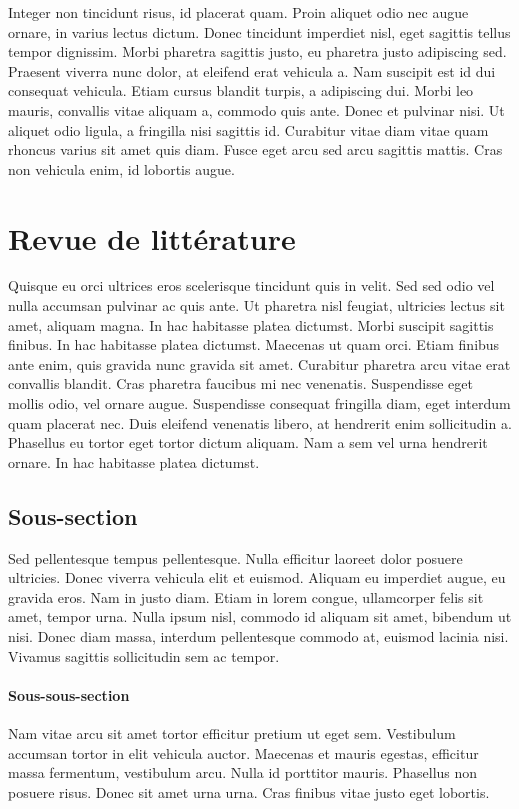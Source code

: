 Integer non tincidunt risus, id placerat quam. Proin aliquet odio nec augue ornare, in varius lectus dictum. Donec tincidunt imperdiet nisl, eget sagittis tellus tempor dignissim. Morbi pharetra sagittis justo, eu pharetra justo adipiscing sed. Praesent viverra nunc dolor, at eleifend erat vehicula a. Nam suscipit est id dui consequat vehicula. Etiam cursus blandit turpis, a adipiscing dui. Morbi leo mauris, convallis vitae aliquam a, commodo quis ante. Donec et pulvinar nisi. Ut aliquet odio ligula, a fringilla nisi sagittis id. Curabitur vitae diam vitae quam rhoncus varius sit amet quis diam. Fusce eget arcu sed arcu sagittis mattis. Cras non vehicula enim, id lobortis augue.

\section{Revue de littérature}
Quisque eu orci ultrices eros scelerisque tincidunt quis in velit. Sed sed odio vel nulla accumsan pulvinar ac quis ante. Ut pharetra nisl feugiat, ultricies lectus sit amet, aliquam magna. In hac habitasse platea dictumst. Morbi suscipit sagittis finibus. In hac habitasse platea dictumst. Maecenas ut quam orci. Etiam finibus ante enim, quis gravida nunc gravida sit amet. Curabitur pharetra arcu vitae erat convallis blandit. Cras pharetra faucibus mi nec venenatis. Suspendisse eget mollis odio, vel ornare augue. Suspendisse consequat fringilla diam, eget interdum quam placerat nec. Duis eleifend venenatis libero, at hendrerit enim sollicitudin a. Phasellus eu tortor eget tortor dictum aliquam. Nam a sem vel urna hendrerit ornare. In hac habitasse platea dictumst.

\subsection{Sous-section}
Sed pellentesque tempus pellentesque. Nulla efficitur laoreet dolor posuere ultricies. Donec viverra vehicula elit et euismod. Aliquam eu imperdiet augue, eu gravida eros. Nam in justo diam. Etiam in lorem congue, ullamcorper felis sit amet, tempor urna. Nulla ipsum nisl, commodo id aliquam sit amet, bibendum ut nisi. Donec diam massa, interdum pellentesque commodo at, euismod lacinia nisi. Vivamus sagittis sollicitudin sem ac tempor.

\paragraph{Sous-sous-section\\}
Nam vitae arcu sit amet tortor efficitur pretium ut eget sem. Vestibulum accumsan tortor in elit vehicula auctor. Maecenas et mauris egestas, efficitur massa fermentum, vestibulum arcu. Nulla id porttitor mauris. Phasellus non posuere risus. Donec sit amet urna urna. Cras finibus vitae justo eget lobortis.

